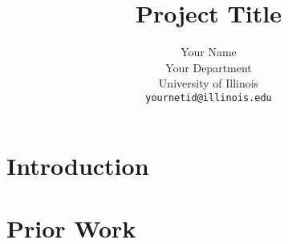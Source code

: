 \documentclass[11pt,a4paper]{article}
\title{Project Title}
\author{Your Name \\
  Your Department \\
  University of Illinois \\
  \texttt{yournetid@illinois.edu}}
\date{}
\begin{document}
\maketitle
\begin{abstract}
\lipsum[1] %
\end{abstract}

\section{Introduction}

\lipsum[2-5] \lipsum[66] %


\section{Prior Work}

\lipsum[6-20] \lipsum[17]

\nocite{Europarl} %



\end{document}
